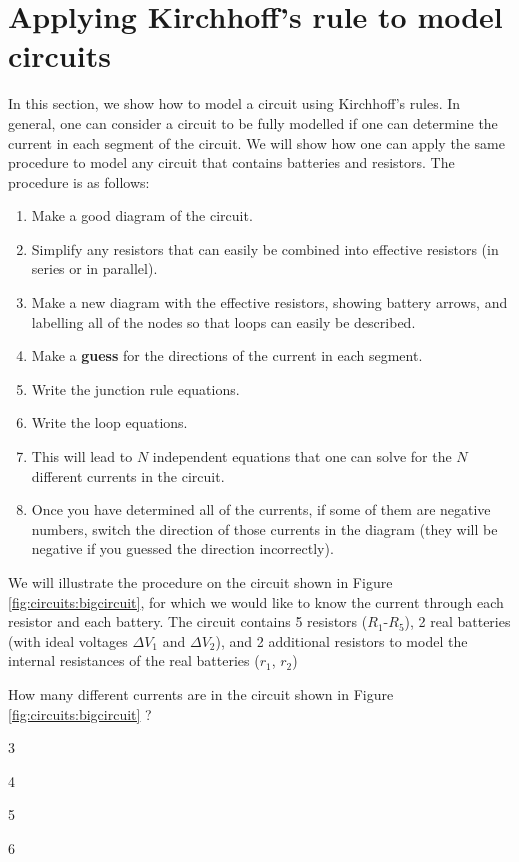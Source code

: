 \section{Applying Kirchhoff's rule to model circuits}
In this section, we show how to model a circuit using Kirchhoff's rules. In general, one can consider a circuit to be fully modelled if one can determine the current in each segment of the circuit. We will show how one can apply the same procedure to model any circuit that contains batteries and resistors. The procedure is as follows:
\begin{enumerate}
\item Make a good diagram of the circuit.
\item Simplify any resistors that can easily be combined into effective resistors (in series or in parallel).
\item Make a new diagram with the effective resistors, showing battery arrows, and labelling all of the nodes so that loops can easily be described.
\item Make a \textbf{guess} for the directions of the current in each segment.
\item Write the junction rule equations.
\item Write the loop equations.
\item This will lead to $N$ independent equations that one can solve for the $N$ different currents in the circuit.
\item Once you have determined all of the currents, if some of them are negative numbers, switch the direction of those currents in the diagram (they will be negative if you guessed the direction incorrectly).
\end{enumerate}

We will illustrate the procedure on the circuit shown in Figure \ref{fig:circuits:bigcircuit}, for which we would like to know the current through each resistor and each battery. The circuit contains 5 resistors ($R_1$-$R_5$), 2 real batteries (with ideal voltages $\Delta V_1$ and $\Delta V_2$), and 2 additional resistors to model the internal resistances of the real batteries ($r_1$, $r_2$)


\begin{checkpoint}{}
\begin{MCquestion}{How many different currents are in the circuit shown in Figure \ref{fig:circuits:bigcircuit} ?}
\item 3
\item 4
\item 5 \correct
\item 6
\end{MCquestion}
\end{checkpoint}

